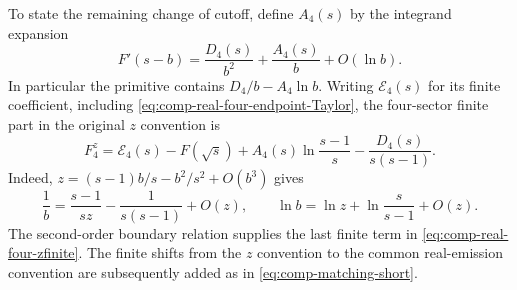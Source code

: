 To state the remaining change of cutoff, define $A_4(s)$ by the
integrand expansion
\begin{equation}
 F'(s-b)=\frac{D_4(s)}{b^2}+\frac{A_4(s)}b+O(\ln b).
\end{equation}
In particular the primitive contains $D_4/b-A_4\ln b$.
Writing $\mathcal E_4(s)$ for its finite coefficient, including
\eqref{eq:comp-real-four-endpoint-Taylor}, the four-sector finite part
in the original $z$ convention is
\begin{equation}
 F_4^z=\mathcal E_4(s)-F(\sqrt{s})
       +A_4(s)\ln\frac{s-1}{s}-\frac{D_4(s)}{s(s-1)}.
 \label{eq:comp-real-four-zfinite}
\end{equation}
Indeed, $z=(s-1)b/s-b^2/s^2+O(b^3)$ gives
\begin{equation}
 \frac1b=\frac{s-1}{sz}-\frac1{s(s-1)}+O(z),
 \qquad \ln b=\ln z+\ln\frac{s}{s-1}+O(z).
\end{equation}
The second-order boundary relation supplies the last finite term in
\eqref{eq:comp-real-four-zfinite}. The finite shifts from the $z$
convention to the common real-emission convention are subsequently
added as in \eqref{eq:comp-matching-short}.

